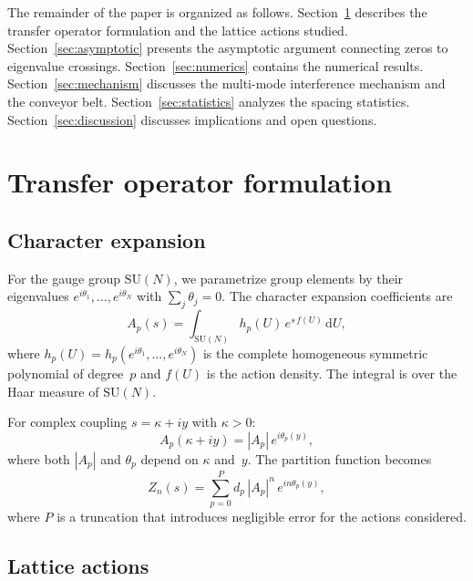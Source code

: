 \documentclass[12pt]{article}
\theoremstyle{definition}
\theoremstyle{remark}
\newcommand{\SU}{\mathrm{SU}}
\newcommand{\dU}{\,\mathrm{d}U}
\begin{document}
The remainder of the paper is organized as follows.
Section~\ref{sec:setup} describes the transfer operator formulation
and the lattice actions studied.  Section~\ref{sec:asymptotic}
presents the asymptotic argument connecting zeros to eigenvalue
crossings.  Section~\ref{sec:numerics} contains the numerical results.
Section~\ref{sec:mechanism} discusses the multi-mode interference
mechanism and the conveyor belt.  Section~\ref{sec:statistics} analyzes
the spacing statistics.  Section~\ref{sec:discussion} discusses
implications and open questions.


\section{Transfer operator formulation}
\label{sec:setup}

\subsection{Character expansion}

For the gauge group $\SU(N)$, we parametrize group elements by their
eigenvalues $e^{i\theta_1}, \ldots, e^{i\theta_N}$ with
$\sum_j \theta_j = 0$.  The character expansion coefficients are
\begin{equation}
A_p(s) = \int_{\SU(N)} h_p(U)\, e^{s\,f(U)}\dU,
\end{equation}
where $h_p(U) = h_p(e^{i\theta_1}, \ldots, e^{i\theta_N})$ is the
complete homogeneous symmetric polynomial of degree~$p$ and $f(U)$
is the action density.  The integral is over the Haar measure of
$\SU(N)$.

For complex coupling $s = \kappa + iy$ with $\kappa > 0$:
\begin{equation}
A_p(\kappa + iy) = |A_p|\, e^{i\theta_p(y)},
\end{equation}
where both $|A_p|$ and $\theta_p$ depend on $\kappa$ and~$y$.
The partition function becomes
\begin{equation}\label{eq:Zn_polar}
Z_n(s) = \sum_{p=0}^{P} d_p\, |A_p|^n\, e^{in\theta_p(y)},
\end{equation}
where $P$ is a truncation that introduces negligible error for the
actions considered.

\subsection{Lattice actions}
\end{document}
